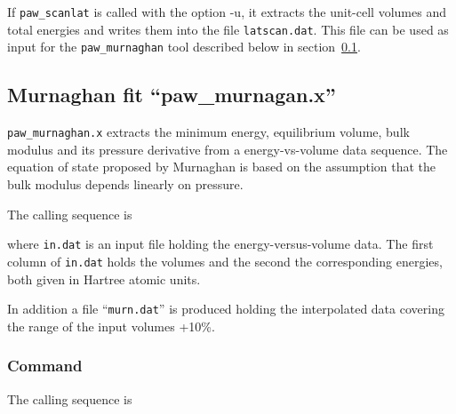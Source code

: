 \documentclass[final,12pt,makeidx,DIV=calc]{article}
\begin{document}
{{{{{{If \verb|paw_scanlat| is called with the option -u, it extracts the
unit-cell volumes and total energies and writes them into the file
\verb|latscan.dat|.  This file can be used as input for the
\verb|paw_murnaghan| tool described below in
section~\ref{sec:pawmurnaghantool}.

\subsection{Murnaghan fit ``paw\_murnagan.x''}
\label{sec:pawmurnaghantool}
{\tt paw\_murnaghan.x} extracts the minimum energy, equilibrium
volume, bulk modulus and its pressure derivative from a
energy-vs-volume data sequence. The equation of state proposed by
Murnaghan\cite{murnaghan44_pnas30_244} is based on the assumption that
the bulk modulus depends linearly on pressure.

The calling sequence is

\bigskip{}\bigskip

where {\tt in.dat} is an input file holding the energy-versus-volume
data.  The first column of {\tt in.dat} holds the volumes and the
second the corresponding energies, both given in Hartree atomic
units. 

In addition a file ``{\tt murn.dat}'' is produced holding the
interpolated data covering the range of the input volumes +10\%.

\subsubsection{Command}
The calling sequence is

\bigskip{}
\vspace{0.5cm}

}}}}}}
\end{document}
